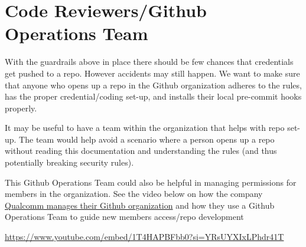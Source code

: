 \documentclass[
  letterpaper,
  DIV=11,
  numbers=noendperiod,
  oneside]{scrartcl}
\begin{document}
\section{Code Reviewers/Github Operations
Team}\label{code-reviewersgithub-operations-team}

With the guardrails above in place there should be few chances that
credentials get pushed to a repo. However accidents may still happen. We
want to make sure that anyone who opens up a repo in the Github
organization adheres to the rules, has the proper credential/coding
set-up, and installs their local pre-commit hooks properly.

It may be useful to have a team within the organization that helps with
repo set-up. The team would help avoid a scenario where a person opens
up a repo without reading this documentation and understanding the rules
(and thus potentially breaking security rules).

This Github Operations Team could also be helpful in managing
permissions for members in the organization. See the video below on how
the company
\href{https://www.youtube.com/embed/1T4HAPBFbb0?si=YRsUYXIxLPhdr41T}{Qualcomm
manages their Github organization} and how they use a Github Operations
Team to guide new members access/repo development

\url{https://www.youtube.com/embed/1T4HAPBFbb0?si=YRsUYXIxLPhdr41T}
\end{document}
